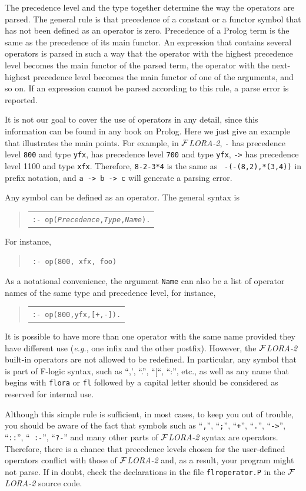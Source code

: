 \documentclass[11pt]{article}
\newenvironment{qrules}{\begin{quote}\tt\begin{tabular}[t]{l}}%
{\end{tabular}\end{quote}}
\newcommand{\FLORA}{{\mbox{${\cal F}${\small\it LORA}\rm\emph{-2}}}\xspace}
\newcommand{\fl}{\mbox{F-logic}\xspace}
\begin{document}
The precedence level and the type together determine the way the operators
are parsed. The general rule is that precedence of a constant or a functor
symbol that has not been defined as an operator is zero. Precedence of a
Prolog term is the same as the precedence of its main functor. 
An expression that contains several operators is parsed in such a way that
the operator with the highest precedence level becomes the main functor of
the parsed term, the operator with the next-highest precedence
level becomes the main functor of one of the arguments, and so on.
If an expression cannot be parsed according to this rule, a parse error is
reported.

It is not our goal to cover the use of operators in any detail, since this
information can be found in any book on Prolog. Here we just give an
example that illustrates the main points.  For example, in \FLORA, {\tt -}
has precedence level {\tt 800} and type {\tt yfx}, {\tt *} has precedence
level {\tt 700} and type {\tt yfx}, {\tt ->} has precedence level 1100 and
type {\tt xfx}.  Therefore, {\tt 8-2-3*4} is the same as {\tt
  -(-(8,2),*(3,4))} in prefix notation, and {\tt a -> b -> c} will generate
a parsing error.


%
Any symbol can be defined as an operator. The general syntax is
\begin{qrules}
{\tt :- op(\emph{Precedence},\emph{Type},\emph{Name}).}
\end{qrules}
For instance, 
\begin{quote}
 {\tt
   :- op(800, xfx, foo)
   }
\end{quote}
As a notational convenience, the argument {\tt Name} can also be a list of
operator names of the same type and precedence level, for instance,
\begin{qrules}
{\tt :- op(800,yfx,[+,-]).}
\end{qrules}
It is possible to have more than one operator with the same name provided
they have different use ({\it e.g.}, one infix and the other postfix).
However, the \FLORA built-in operators are not allowed to be redefined.
In particular, any symbol that is part of \fl syntax, such as ``,', ``.'',
``[``, ``:'', etc., as well as any name that begins with {\tt flora} or
{\tt fl} followed by a capital letter should be considered as reserved for
internal use.

Although this simple rule is sufficient, in most cases, to keep you out of
trouble, you should be aware of the fact that symbols such as ``{\tt ,}'',
``{\tt ;}'', ``{\tt +}'', ``{\tt .}'', ``{\tt ->}'', ``{\tt ::}'', ``{\tt
  :-}'', ``{\tt ?-}'' and many
other parts of \FLORA syntax are operators. Therefore, there is a chance
that precedence levels chosen for the user-defined operators conflict with
those of \FLORA and, as a result, your program might not parse. If in
doubt, check the declarations in the file {\tt flroperator.P} in the \FLORA
source code.
\end{document}
